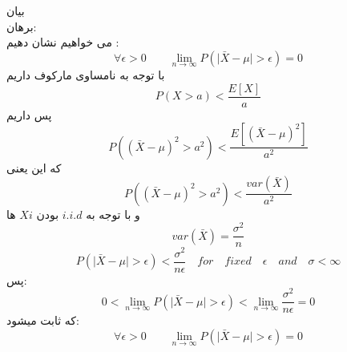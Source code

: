 \problem{}
\subproblem{}
بیان \\
\subproblem{}
برهان:\\
می خواهیم نشان دهیم :\\ 
\[ \forall \epsilon >0 \quad \quad \lim_{{n \to \infty}} P(\lvert \bar{X} - \mu \rvert > \epsilon) = 0 \]
با توجه به نامساوی مارکوف داریم\\
\[P(X>a)<\frac{E[X]}{a} \] 
پس داریم
\[P((\bar{X} - \mu)^2>a^2)<\frac{E[( \bar{X} - \mu)^2]}{a^2} \] 
که این یعنی
\[P((\bar{X} - \mu)^2>a^2)<\frac{var(\bar{X})}{a^2} \] 
و با توجه به $i.i.d$ بودن $Xi$ ها 
\[var(\bar{X}) = \frac{\sigma^2}{n}\]
\[ P(\lvert \bar{X} - \mu \rvert > \epsilon ) < \frac{\sigma^2}{n\epsilon} \quad for \quad fixed \quad \epsilon \quad and \quad  \sigma<\infty\] 
پس:
\[0 < \lim_{{n \to \infty}} P(\lvert \bar{X} - \mu \rvert > \epsilon) <\lim_{{n \to \infty}} \frac{\sigma^2}{n\epsilon} = 0 \]
که ثابت میشود:
\[ \forall \epsilon >0 \quad \quad \lim_{{n \to \infty}} P(\lvert \bar{X} - \mu \rvert > \epsilon) = 0 \]

\subproblem{}
